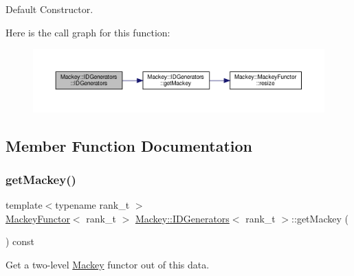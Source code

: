 Default Constructor. 

Here is the call graph for this function\+:\nopagebreak
\begin{figure}[H]
\begin{center}
\leavevmode
\includegraphics[width=350pt]{classMackey_1_1IDGenerators_ad4e041defebc49fb90c1e7d78b066cdf_cgraph}
\end{center}
\end{figure}


\subsection{Member Function Documentation}
\mbox{\label{classMackey_1_1IDGenerators_a9669af6c07a9ed5a91a662aef6cda1ed}} 
\subsubsection{\texorpdfstring{get\+Mackey()}{getMackey()}}
{\footnotesize\ttfamily template$<$typename rank\+\_\+t $>$ \\
\hyperlink{classMackey_1_1MackeyFunctor}{Mackey\+Functor}$<$ rank\+\_\+t $>$ \hyperlink{classMackey_1_1IDGenerators}{Mackey\+::\+I\+D\+Generators}$<$ rank\+\_\+t $>$\+::get\+Mackey (\begin{DoxyParamCaption}{ }\end{DoxyParamCaption}) const}



Get a two-\/level \hyperlink{namespaceMackey}{Mackey} functor out of this data. 

